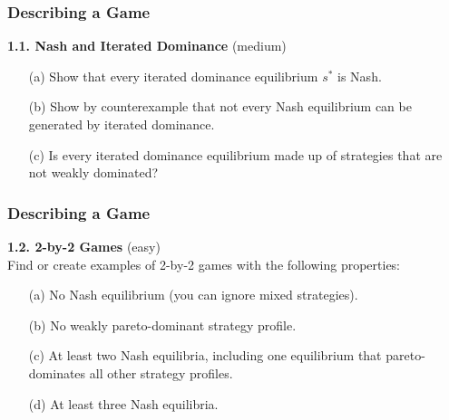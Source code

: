  \begin{frame}[fragile]\frametitle{Describing a Game}
 


 {\bf 1.1. Nash and Iterated Dominance } (medium)

 \begin{enumerate}

   \item[(a)] Show that every iterated dominance   equilibrium $s^*$ is Nash.

         \item[(b)] Show by counterexample that not   every Nash equilibrium can
be generated by iterated dominance.

 \item[(c)] Is every iterated dominance   equilibrium   made up of  strategies
that are not weakly dominated?

 \end{enumerate}

\end{frame}
 \begin{frame}[fragile]\frametitle{Describing a Game}

 {\bf 1.2. 2-by-2 Games } (easy)\\
 Find or create examples of 2-by-2 games with the following properties:

 \begin{enumerate}

 \item[(a)] No Nash equilibrium (you can ignore mixed strategies).

 \item[(b)] No weakly pareto-dominant strategy profile.

 \item[(c)] At least two Nash equilibria, including one equilibrium that pareto-
dominates all other strategy profiles.

 \item[(d)] At least three Nash equilibria. \end{enumerate}

\end{frame}
